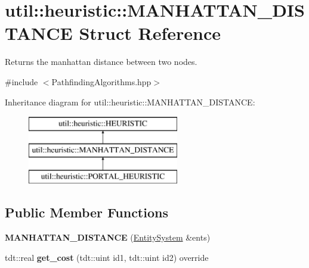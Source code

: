\hypertarget{structutil_1_1heuristic_1_1_m_a_n_h_a_t_t_a_n___d_i_s_t_a_n_c_e}{}\section{util\+:\+:heuristic\+:\+:M\+A\+N\+H\+A\+T\+T\+A\+N\+\_\+\+D\+I\+S\+T\+A\+N\+CE Struct Reference}
\label{structutil_1_1heuristic_1_1_m_a_n_h_a_t_t_a_n___d_i_s_t_a_n_c_e}


Returns the manhattan distance between two nodes.  




{\ttfamily \#include $<$Pathfinding\+Algorithms.\+hpp$>$}

Inheritance diagram for util\+:\+:heuristic\+:\+:M\+A\+N\+H\+A\+T\+T\+A\+N\+\_\+\+D\+I\+S\+T\+A\+N\+CE\+:\begin{figure}[H]
\begin{center}
\leavevmode
\includegraphics[height=3.000000cm]{structutil_1_1heuristic_1_1_m_a_n_h_a_t_t_a_n___d_i_s_t_a_n_c_e}
\end{center}
\end{figure}
\subsection*{Public Member Functions}
\begin{DoxyCompactItemize}
\item 
{\bfseries M\+A\+N\+H\+A\+T\+T\+A\+N\+\_\+\+D\+I\+S\+T\+A\+N\+CE} (\hyperlink{class_entity_system}{Entity\+System} \&ents)\hypertarget{structutil_1_1heuristic_1_1_m_a_n_h_a_t_t_a_n___d_i_s_t_a_n_c_e_ad14e300361283f50d728e5a2c6005fb5}{}\label{structutil_1_1heuristic_1_1_m_a_n_h_a_t_t_a_n___d_i_s_t_a_n_c_e_ad14e300361283f50d728e5a2c6005fb5}

\item 
tdt\+::real {\bfseries get\+\_\+cost} (tdt\+::uint id1, tdt\+::uint id2) override\hypertarget{structutil_1_1heuristic_1_1_m_a_n_h_a_t_t_a_n___d_i_s_t_a_n_c_e_a9ef25541d53eb8b7ab5f8fcdd08b384a}{}\label{structutil_1_1heuristic_1_1_m_a_n_h_a_t_t_a_n___d_i_s_t_a_n_c_e_a9ef25541d53eb8b7ab5f8fcdd08b384a}

\end{DoxyCompactItemize}
